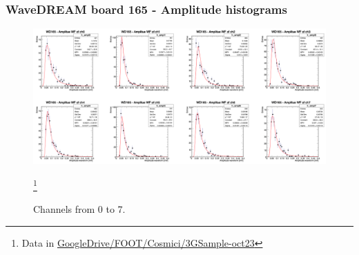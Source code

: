 \begin{frame} [fragile]
    \small
        \frametitle{WaveDREAM board 165 - Amplitude histograms}
                \begin{figure}
             \centering
                \includegraphics[scale=0.28]{figures/hist_ampl_1.png}
                \caption{Channels from 0 to 7.} \footnote{Data in \href{https://drive.google.com/drive/u/1/folders/16qDMMqx-QTr3lPnTk-1lWUYrBUTcSdOi}{GoogleDrive/FOOT/Cosmici/3GSample-oct23}}
            \end{figure}
    \end{frame}
